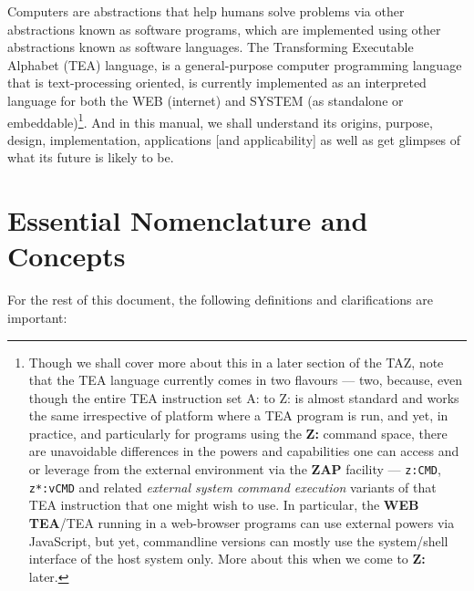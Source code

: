 \documentclass[a4paper, 18pt]{book} %
\begin{document}
Computers are abstractions that help humans solve problems via other abstractions known as software programs, which are implemented using other abstractions known as software languages. The Transforming Executable Alphabet (TEA) language, is a general-purpose computer programming language that is text-processing oriented, is currently implemented as an interpreted language for both the WEB (internet) and SYSTEM (as standalone or embeddable)\footnote{Though we shall cover more about this in a later section of the TAZ, note that the TEA language currently comes in two flavours --- two, because, even though the entire TEA instruction set A: to Z: is almost standard and works the same irrespective of platform where a TEA program is run, and yet, in practice, and particularly for programs using the \textbf{Z:} command space, there are unavoidable differences in the powers and capabilities one can access and or leverage from the external environment via the \textbf{ZAP} facility --- \texttt{z:CMD}, \texttt{z*:vCMD} and related \textit{external system command execution} variants of that TEA instruction that one might wish to use. In particular, the \textbf{WEB TEA}/TEA running in a web-browser programs can use external powers via JavaScript, but yet, commandline versions can mostly use the system/shell interface of the host system only. More about this when we come to \textbf{Z:} later.}. And in this manual, we shall understand its origins, purpose, design, implementation, applications [and applicability] as well as get glimpses of what its future is likely to be.

\section{Essential Nomenclature and Concepts}

For the rest of this document, the following definitions and clarifications are important:\\
\end{document}
